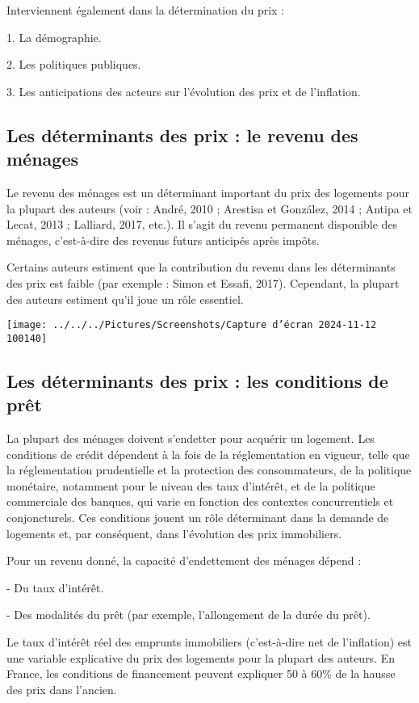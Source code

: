 \documentclass[a4paper, 12pt]{report}
\begin{document}
Interviennent également dans la détermination du prix :

1. La démographie.

2. Les politiques publiques.

3. Les anticipations des acteurs sur l’évolution des prix et de l’inflation.

\subsection{Les déterminants des prix : le revenu des ménages}

Le revenu des ménages est un déterminant important du prix des logements pour la plupart des auteurs (voir : André, 2010 ; Arestisa et González, 2014 ; Antipa et Lecat, 2013 ; Lalliard, 2017, etc.). Il s’agit du revenu permanent disponible des ménages, c’est-à-dire des revenus futurs anticipés après impôts.

Certains auteurs estiment que la contribution du revenu dans les déterminants des prix est faible (par exemple : Simon et Essafi, 2017). Cependant, la plupart des auteurs estiment qu’il joue un rôle essentiel.

\begin{center}
	\texttt{[image: ../../../Pictures/Screenshots/Capture d'écran 2024-11-12 100140]}
\end{center}

\subsection{Les déterminants des prix : les conditions de prêt}

La plupart des ménages doivent s’endetter pour acquérir un logement. Les conditions de crédit dépendent à la fois de la réglementation en vigueur, telle que la réglementation prudentielle et la protection des consommateurs, de la politique monétaire, notamment pour le niveau des taux d’intérêt, et de la politique commerciale des banques, qui varie en fonction des contextes concurrentiels et conjoncturels. Ces conditions jouent un rôle déterminant dans la demande de logements et, par conséquent, dans l’évolution des prix immobiliers.


Pour un revenu donné, la capacité d’endettement des ménages dépend :

- Du taux d’intérêt.

- Des modalités du prêt (par exemple, l’allongement de la durée du prêt).

Le taux d’intérêt réel des emprunts immobiliers (c’est-à-dire net de l’inflation) est une variable explicative du prix des logements pour la plupart des auteurs. En France, les conditions de financement peuvent expliquer 50 à 60\% de la hausse des prix dans l’ancien.
\end{document}
